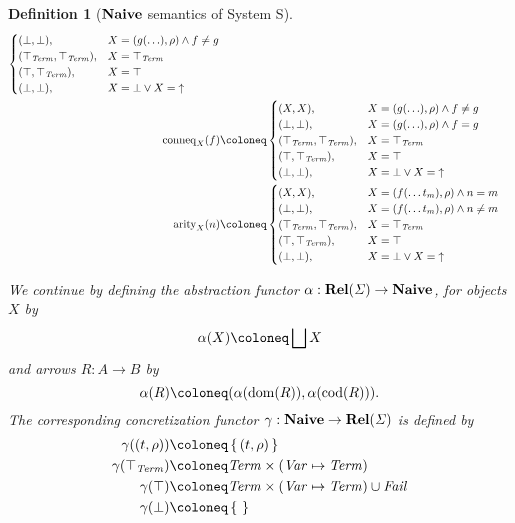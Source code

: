 \documentclass{article}
\newtheorem{definition}[theorem]{Definition}
\newcommand{\fail}{\ensuremath \text{$\uparrow$}}
\newcommand{\dom}{\ensuremath \operatorname{dom}}
\newcommand{\cod}{\ensuremath \operatorname{cod}}
\newcommand{\Term}{\ensuremath \mathit{Term}}
\newcommand{\Fail}{\ensuremath \mathit{Fail}}
\newcommand{\Var}{\ensuremath \mathit{Var}}
\newcommand{\Env}{\ensuremath \Var \mapsto \Term}
\newcommand{\Cat}[1]{\ensuremath \mathbf{#1}}
\newcommand{\State}{\ensuremath \mathit{\Sigma} }
\newcommand{\setbuildc}[1]{\ensuremath \left\{\, #1 \,\right\}}
\newcommand{\Rel}{\ensuremath \Cat{Rel}}
\newcommand{\Naive}{\ensuremath \Cat{Naive}}
\newcommand{\lub}{\ensuremath \bigsqcup}
\newcommand{\arity}{\ensuremath \operatorname{arity}}
\newcommand{\conneq}{\ensuremath \operatorname{conneq}}
\newcommand{\ttop}{\ensuremath \top_{\Term}}
\begin{document}
\begin{definition}[$\Naive$ semantics of System S]
\begin{align*}
\begin{cases}
                  (\bot,\bot), & X = (g(\ldots),\rho) \land f \neq g \\
                  (\ttop,\ttop), & X = \ttop \\
                  (\top,\ttop), & X = \top \\
                  (\bot,\bot), & X = \bot \lor X = \fail \\
                \end{cases} \\
    \conneq_X(f) &\coloneq
                \begin{cases}
                  (X,X), & X = (g(\ldots),\rho) \land f \neq g \\
                  (\bot,\bot), & X = (g(\ldots),\rho) \land f = g \\
                  (\ttop,\ttop), & X = \ttop \\
                  (\top,\ttop), & X = \top \\
                  (\bot,\bot), & X = \bot \lor X = \fail \\
                \end{cases} \\
    \arity_X(n) &\coloneq
                \begin{cases}
                  (X,X), & X = (f(\ldots t_m),\rho) \land n = m \\
                  (\bot,\bot), & X = (f(\ldots t_m),\rho) \land n \neq m \\
                  (\ttop,\ttop), & X = \ttop \\
                  (\top,\ttop), & X = \top \\
                  (\bot,\bot), & X = \bot \lor X = \fail \\
                \end{cases} \\
  \end{align*}

  We continue by defining the abstraction functor $\alpha : \Rel(\State) \rightarrow \Naive$, for objects $X$ by \[\alpha(X) \coloneq \lub X \] and arrows $R : A \rightarrow B$ by \[\alpha(R) \coloneq (\alpha(\dom(R)), \alpha(\cod(R))). \] The corresponding concretization functor $\gamma : \Naive \rightarrow \Rel(\State)$ is defined by
  \begin{align*}
    \gamma((t,\rho)) &\coloneq \setbuildc{ (t,\rho) } \\
    \gamma(\ttop) &\coloneq \Term \times (\Env) \\
    \gamma(\top) &\coloneq \Term \times (\Env) \cup \Fail \\
    \gamma(\bot) &\coloneq \setbuildc{} \\
  \end{align*}


\end{definition}
\end{document}
